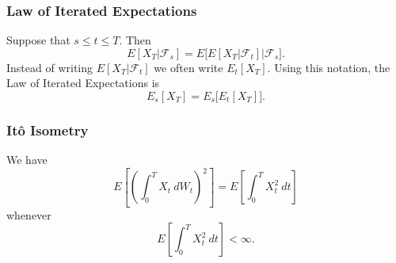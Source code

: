 \documentclass{beamer}
\begin{document}
\begin{frame}
\frametitle{Law of Iterated Expectations}
Suppose that $s \leq t \leq T$. Then
$$
E[X_T |\mathcal{F}_s] = E\Big[E[X_T|\mathcal{F}_t] \Big|\mathcal{F}_s\Big].
$$
Instead of writing $E[X_T |\mathcal{F}_t]$ we often write $E_t[X_T]$. Using this notation, the Law of Iterated Expectations is
$$
E_s[X_T] = E_s\Big[E_t[X_T]\Big].
$$
\end{frame}

\begin{frame}
\frametitle{It\^o Isometry}
\begin{Theorem}[It\^o Isometry]
We have
$$
E\left[\left(\int_0^T X_t\ dW_t\right)^2\right] = E\left[\int_0^T X_t^2\ dt\right]
$$
whenever
$$
E\left[\int_0^T X_t^2\ dt\right] < \infty.
$$
\end{Theorem}
\end{frame}
\end{document}
